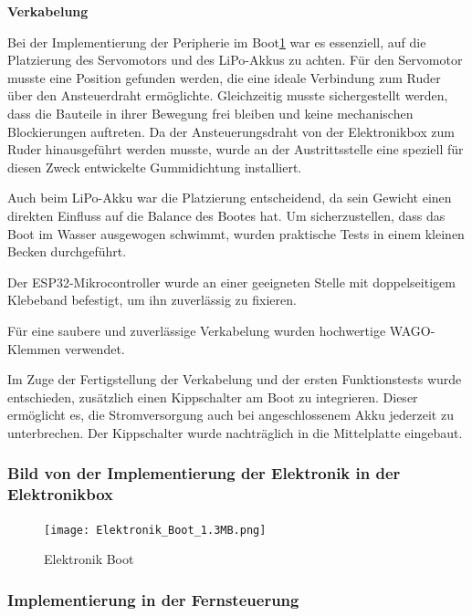 \documentclass[a4paper,12pt]{article}
\begin{document}
\textbf{Verkabelung}

Bei der Implementierung der Peripherie im Boot\ref{fig:Elektronik Boot} war es essenziell, auf die Platzierung des Servomotors und des LiPo-Akkus zu achten. Für den Servomotor musste eine Position gefunden werden, die eine ideale Verbindung zum Ruder über den Ansteuerdraht ermöglichte. Gleichzeitig musste sichergestellt werden, dass die Bauteile in ihrer Bewegung frei bleiben und keine mechanischen Blockierungen auftreten. Da der Ansteuerungsdraht von der Elektronikbox zum Ruder hinausgeführt werden musste, wurde an der Austrittsstelle eine speziell für diesen Zweck entwickelte Gummidichtung installiert.\newline

Auch beim LiPo-Akku war die Platzierung entscheidend, da sein Gewicht einen direkten Einfluss auf die Balance des Bootes hat. Um sicherzustellen, dass das Boot im Wasser ausgewogen schwimmt, wurden praktische Tests in einem kleinen Becken durchgeführt.\newline

Der ESP32-Mikrocontroller wurde an einer geeigneten Stelle mit doppelseitigem Klebeband befestigt, um ihn zuverlässig zu fixieren.

Für eine saubere und zuverlässige Verkabelung wurden hochwertige WAGO-Klemmen verwendet.\newline

Im Zuge der Fertigstellung der Verkabelung und der ersten Funktionstests wurde entschieden, zusätzlich einen Kippschalter am Boot zu integrieren. Dieser ermöglicht es, die Stromversorgung auch bei angeschlossenem Akku jederzeit zu unterbrechen. Der Kippschalter wurde nachträglich in die Mittelplatte eingebaut.\newline

\subsubsection{Bild von der Implementierung der Elektronik in der Elektronikbox}

\begin{figure}[H]
    \centering
    \texttt{[image: Elektronik\_Boot\_1.3MB.png]}
    \caption{Elektronik Boot}
    \label{fig:Elektronik Boot}
\end{figure}



\subsubsection{Implementierung in der Fernsteuerung}
\end{document}
